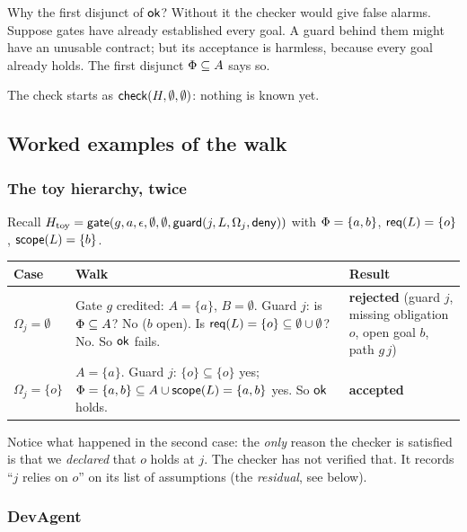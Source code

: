 \begin{warning}{Why the first disjunct of $\mathsf{ok}$?}
Without it the checker would give false alarms. Suppose gates have already established every goal. A guard behind them might have an unusable contract; but its acceptance is harmless, because every goal already holds. The first disjunct $\Phi\subseteq A$ says so.
\end{warning}

The check starts as $\mathsf{check}(H,\emptyset,\emptyset)$: nothing is known yet.

\subsection{Worked examples of the walk}

\subsubsection*{The toy hierarchy, twice}

Recall $H_{\mathrm{toy}}=\mathsf{gate}(g,a,\epsilon,\emptyset,\emptyset,\mathsf{guard}(j,L,\Omega_j,\mathsf{deny}))$ with $\Phi=\{a,b\}$, $\mathsf{req}(L)=\{o\}$, $\mathsf{scope}(L)=\{b\}$.

\begin{center}
\renewcommand{\arraystretch}{1.3}
\begin{tabularx}{\textwidth}{@{}p{3.1cm}p{3.6cm}X@{}}
\toprule
\textbf{Case} & \textbf{Walk} & \textbf{Result}\\
\midrule
$\Omega_j=\emptyset$ & Gate $g$ credited: $A=\{a\}$, $B=\emptyset$. Guard $j$: is $\Phi\subseteq A$? No ($b$ open). Is $\mathsf{req}(L)=\{o\}\subseteq\emptyset\cup\emptyset$? No. So $\mathsf{ok}$ fails. & \textcolor{tintred}{\textbf{rejected}} (guard $j$, missing obligation $o$, open goal $b$, path $g\,j$)\\[6pt]
$\Omega_j=\{o\}$ & $A=\{a\}$. Guard $j$: $\{o\}\subseteq\{o\}$ yes; $\Phi=\{a,b\}\subseteq A\cup\mathsf{scope}(L)=\{a,b\}$ yes. So $\mathsf{ok}$ holds. & \textcolor{tintgreen}{\textbf{accepted}}\\
\bottomrule
\end{tabularx}
\end{center}

Notice what happened in the second case: the \emph{only} reason the checker is satisfied is that we \emph{declared} that $o$ holds at $j$. The checker has not verified that. It records ``$j$ relies on $o$'' on its list of assumptions (the \emph{residual}, see below).

\subsubsection*{DevAgent}


